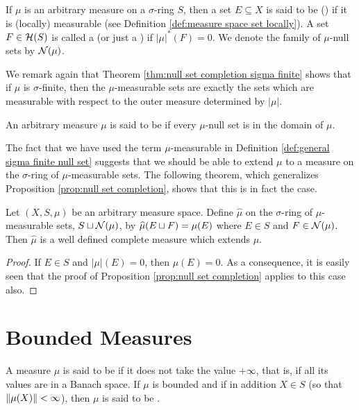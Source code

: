 \begin{definition}
\label{def:general sigma finite null set}
If $\mu$ is an arbitrary measure on a $\sigma$-ring $S$, then a set $E \subseteq X$ is said to be ()  if it is (locally) measurable (see Definition \ref{def:measure space set locally}). A set $F \in {\cal H}(S)$ is called a  (or just a ) if $|\mu|^*(F)=0$. We denote the family of $\mu$-null sets by ${\cal N}(\mu)$.
\end{definition}

We remark again that Theorem \ref{thm:null set completion sigma finite} shows that if $\mu$ is $\sigma$-finite, then the $\mu$-measurable sets are exactly the sets which are measurable with respect to the outer measure determined by $|\mu|$.

\begin{definition}
An arbitrary measure $\mu$ is said to be  if every $\mu$-null set is in the domain of $\mu$.
\end{definition}

The fact that we have used the term $\mu$-measurable in Definition \ref{def:general sigma finite null set} suggests that we should be able to extend $\mu$ to a measure on the $\sigma$-ring of $\mu$-measurable sets. The following theorem, which generalizes Proposition \ref{prop:null set completion}, shows that this is in fact the case.

\begin{theorem}
\label{thm:completion of general measure}
Let $(X, S, \mu)$ be an arbitrary measure space. Define $\widehat{\mu}$ on the $\sigma$-ring of $\mu$-measurable sets, $S\sqcup{\cal N}(\mu)$, by $\widehat{\mu}(E\sqcup F)=\mu(E)$ where $E\in S$ and ${F} \in {\cal N}(\mu)$. Then $\widehat{\mu}$ is a well defined complete measure which extends $\mu$.
\end{theorem}

\begin{proof}
If $E \in S$ and $|\mu|(E)=0$, then $\mu(E)=0$. As a consequence, it is easily seen that the proof of Proposition \ref{prop:null set completion} applies to this case also.
\end{proof}

\section{Bounded Measures}
\begin{definition}
A measure $\mu$ is said to be  if it does not take the value $+\infty$, that is, if all its values are in a Banach space. If $\mu$ is bounded and if in addition $X\in S$ (so that $\norm{\mu(X)}<\infty$), then $\mu$ is said to be .
\end{definition}

